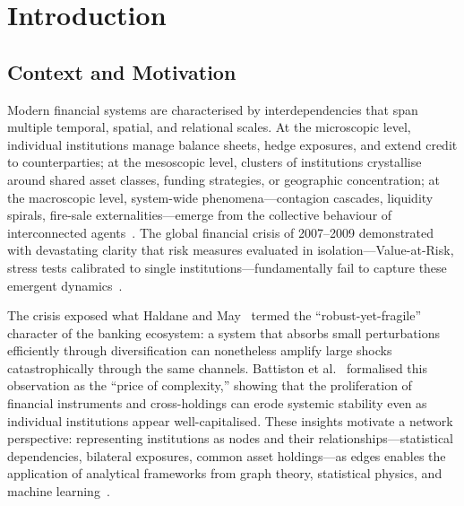 

\chapter{Introduction}
\label{ch:introduction}

\section{Context and Motivation}
\label{sec:context}

Modern financial systems are characterised by interdependencies that span
multiple temporal, spatial, and relational scales.  At the microscopic
level, individual institutions manage balance sheets, hedge exposures, and
extend credit to counterparties; at the mesoscopic level, clusters of
institutions crystallise around shared asset classes, funding strategies,
or geographic concentration; at the macroscopic level, system-wide
phenomena---contagion cascades, liquidity spirals, fire-sale
externalities---emerge from the collective behaviour of interconnected
agents~\cite{bardoscia2021physics,mantegna1999introduction}.  The global
financial crisis of 2007--2009 demonstrated with devastating clarity that
risk measures evaluated in isolation---Value-at-Risk, stress tests
calibrated to single institutions---fundamentally fail to capture these
emergent dynamics~\cite{brunnermeier2009market,bisias2012survey}.

The crisis exposed what Haldane and May~\cite{haldane2011systemic} termed
the ``robust-yet-fragile'' character of the banking ecosystem: a system
that absorbs small perturbations efficiently through diversification can
nonetheless amplify large shocks catastrophically through the same
channels.  Battiston et al.~\cite{battiston2016price} formalised this
observation as the ``price of complexity,'' showing that the proliferation
of financial instruments and cross-holdings can erode systemic stability
even as individual institutions appear well-capitalised.  These insights
motivate a network perspective: representing institutions as nodes and
their relationships---statistical dependencies, bilateral exposures,
common asset holdings---as edges enables the application of analytical
frameworks from graph theory, statistical physics, and machine
learning~\cite{newman2003structure,barabasi2016network}.

